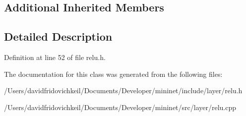 \subsection*{Additional Inherited Members}


\subsection{Detailed Description}


Definition at line 52 of file relu.\+h.



The documentation for this class was generated from the following files\+:\begin{DoxyCompactItemize}
\item 
/\+Users/davidfridovichkeil/\+Documents/\+Developer/mininet/include/layer/relu.\+h\item 
/\+Users/davidfridovichkeil/\+Documents/\+Developer/mininet/src/layer/relu.\+cpp\end{DoxyCompactItemize}
